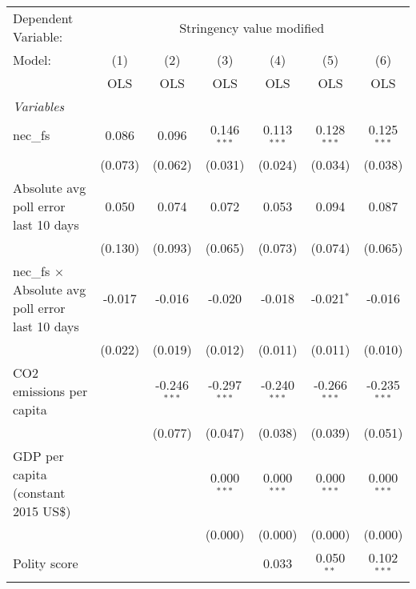 
\begingroup
\centering
\begin{tabular}{lcccccc}
   \toprule
   Dependent Variable: & \multicolumn{6}{c}{Stringency value modified}\\
   Model:                                                  & (1)     & (2)            & (3)            & (4)            & (5)            & (6)\\  
                                                           &  OLS    & OLS            & OLS            & OLS            & OLS            & OLS\\  
   \midrule
   \emph{Variables}\\
   nec\_fs                                                 & 0.086   & 0.096          & 0.146$^{***}$  & 0.113$^{***}$  & 0.128$^{***}$  & 0.125$^{***}$\\   
                                                           & (0.073) & (0.062)        & (0.031)        & (0.024)        & (0.034)        & (0.038)\\   
   Absolute avg poll error last 10 days                    & 0.050   & 0.074          & 0.072          & 0.053          & 0.094          & 0.087\\   
                                                           & (0.130) & (0.093)        & (0.065)        & (0.073)        & (0.074)        & (0.065)\\   
   nec\_fs $\times$ Absolute avg poll error last 10 days   & -0.017  & -0.016         & -0.020         & -0.018         & -0.021$^{*}$   & -0.016\\   
                                                           & (0.022) & (0.019)        & (0.012)        & (0.011)        & (0.011)        & (0.010)\\   
   CO2 emissions per capita                                &         & -0.246$^{***}$ & -0.297$^{***}$ & -0.240$^{***}$ & -0.266$^{***}$ & -0.235$^{***}$\\   
                                                           &         & (0.077)        & (0.047)        & (0.038)        & (0.039)        & (0.051)\\   
   GDP per capita (constant 2015 US\$)                     &         &                & 0.000$^{***}$  & 0.000$^{***}$  & 0.000$^{***}$  & 0.000$^{***}$\\   
                                                           &         &                & (0.000)        & (0.000)        & (0.000)        & (0.000)\\   
   Polity score                                            &         &                &                & 0.033          & 0.050$^{**}$   & 0.102$^{***}$\\   

\end{tabular}
